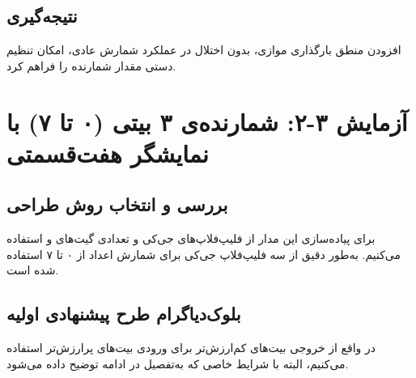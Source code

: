 \documentclass[12pt,a4paper]{article}
\begin{document}
\subsection{نتیجه‌گیری}
افزودن منطق بارگذاری موازی، بدون اختلال در عملکرد شمارش عادی، امکان تنظیم دستی مقدار شمارنده را فراهم کرد.

\newpage

\section{آزمایش ۳-۲: شمارنده‌ی ۳ بیتی (۰ تا ۷) با نمایشگر هفت‌قسمتی}


\subsection{بررسی و انتخاب روش طراحی}
برای پیاده‌سازی این مدار از فلیپ‌فلاپ‌های جی‌کی  و تعدادی گیت‌های  و  استفاده می‌کنیم. به‌طور دقیق از سه فلیپ‌فلاپ جی‌کی برای شمارش اعداد از ۰ تا ۷ استفاده شده است.

\subsection{بلوک‌دیاگرام طرح پیشنهادی اولیه}
در واقع از خروجی بیت‌های کم‌ارزش‌تر برای ورودی بیت‌های پرارزش‌تر استفاده می‌کنیم، البته با شرایط خاصی که به‌تفصیل در ادامه توضیح داده می‌شود.
\end{document}
